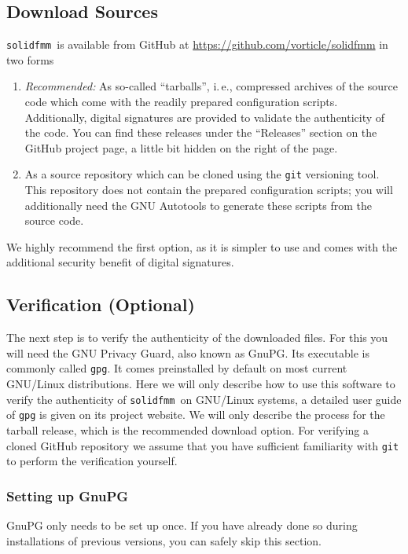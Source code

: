 \documentclass{scrbook}
\newcommand{\solidfmm}{\texttt{solidfmm}}
\begin{document}
\subsection{Download Sources}
\solidfmm\ is available from GitHub at
\url{https://github.com/vorticle/solidfmm} in two forms
\begin{enumerate}
\item\emph{Recommended:} As so-called \enquote{tarballs}, i.\,e., compressed
archives of the source code which come with the readily prepared configuration
scripts. Additionally, digital signatures are provided to validate the
authenticity of the code. You can find these releases under the
\enquote{Releases} section on the GitHub project page, a little bit hidden on
the right of the page.
\item As a source repository which can be cloned using the \lstinline|git| 
versioning tool. This repository does not contain the prepared configuration
scripts; you will additionally need the GNU Autotools to generate these
scripts from the source code.
\end{enumerate}

We highly recommend the first option, as it is simpler to use and comes with
the additional security benefit of digital signatures.

\subsection{Verification (Optional)}
The next step is to verify the authenticity of the downloaded files. For this
you will need the GNU Privacy Guard, also known as GnuPG.\autocite{gnupg} Its
executable is commonly called \lstinline|gpg|. It comes preinstalled by default
on most current GNU/Linux distributions. Here we will only describe how to use
this software to verify the authenticity of \solidfmm\ on GNU/Linux systems, a
detailed user guide of \lstinline|gpg| is given on its project website. We will
only describe the process for the tarball release, which is the recommended
download option. For verifying a cloned GitHub repository we assume that you
have sufficient familiarity with \lstinline|git| to perform the verification
yourself.

\subsubsection{Setting up GnuPG}
GnuPG only needs to be set up once. If you have already done so during
installations of previous versions, you can safely skip this section.
\end{document}

